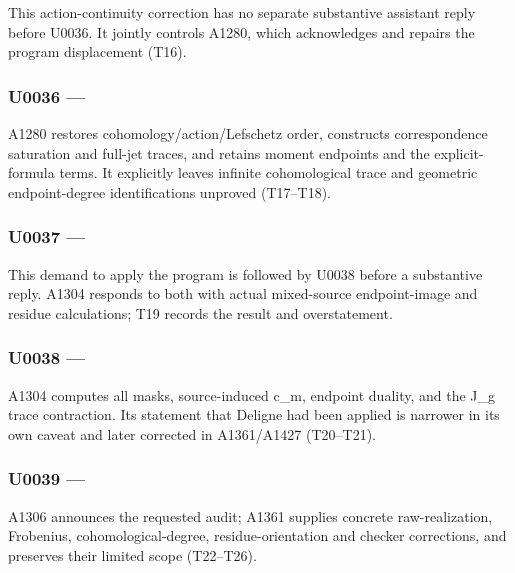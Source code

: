 \documentclass[10pt,a4paper,oneside]{report}
\begin{document}
This action-continuity correction has no separate substantive assistant
reply before U0036. It jointly controls A1280, which acknowledges and
repairs the program displacement (T16).

\subsubsection{\texorpdfstring{U0036 ---
\protect{}}{U0036 --- }}\label{u0036-d6542f7d-b917-4de5-b35d-07062f16e9c1}

A1280 restores cohomology/action/Lefschetz order, constructs
correspondence saturation and full-jet traces, and retains moment
endpoints and the explicit-formula terms. It explicitly leaves infinite
cohomological trace and geometric endpoint-degree identifications
unproved (T17--T18).

\subsubsection{\texorpdfstring{U0037 ---
\protect{}}{U0037 --- }}\label{u0037-8b2110e7-195b-42d0-8c86-7277004e35fd}

This demand to apply the program is followed by U0038 before a
substantive reply. A1304 responds to both with actual mixed-source
endpoint-image and residue calculations; T19 records the result and
overstatement.

\subsubsection{\texorpdfstring{U0038 ---
\protect{}}{U0038 --- }}\label{u0038-4ab2ff8f-915a-417d-876f-7294ed662b24}

A1304 computes all masks, source-induced c\_m, endpoint duality, and the
J\_g trace contraction. Its statement that Deligne had been applied is
narrower in its own caveat and later corrected in A1361/A1427
(T20--T21).

\subsubsection{\texorpdfstring{U0039 ---
\protect{}}{U0039 --- }}\label{u0039-71c1d5ee-668e-4eea-ac21-d844702248ea}

A1306 announces the requested audit; A1361 supplies concrete
raw-realization, Frobenius, cohomological-degree, residue-orientation
and checker corrections, and preserves their limited scope (T22--T26).
\end{document}
